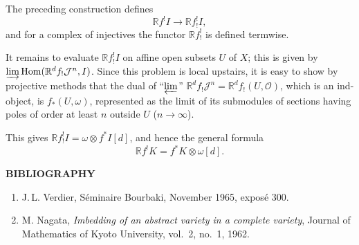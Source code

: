 \documentclass[11pt]{amsart}
\DeclareMathOperator{\Hom}{Hom}
\newcommand{\cJ}{\mathcal{J}}
\newcommand{\cO}{\mathcal{O}}
\newcommand{\bR}{\mathbb{R}}
\theoremstyle{plain}
\theoremstyle{definition}
\begin{document}
The preceding construction defines
\[
\bR f^{!}I\to \bR f^{!}_{!}I,
\]
and for a complex of injectives the functor $\bR f^{!}_{!}$ is defined termwise.

It remains to evaluate $\bR f^{!}_{!}I$ on affine open subsets $U$ of $X$; this is given by $\varinjlim \Hom(\bR^d f_!\cJ^n,I)$. Since this problem is local upstairs, it is easy to show by projective methods that the dual of ``$\varprojlim$'' $\bR^d f_!\cJ^n=\bR^d f_!(U,\cO)$, which is an ind-object, is $f_*(U,\omega)$, represented as the limit of its submodules of sections having poles of order at least $n$ outside $U$ ($n\to\infty$).

This gives $\bR f^{!}_{!}I=\omega\otimes f^*I[d]$, and hence the general formula
\[
\bR f^{!}K=f^*K\otimes \omega[d].
\]

\bigskip
\begin{center}
\textbf{BIBLIOGRAPHY}
\end{center}

\begin{enumerate}
\item[{[1]}] J.\,L. Verdier, S\'eminaire Bourbaki, November 1965, expos\'e 300.
\item[{[2]}] M. Nagata, \emph{Imbedding of an abstract variety in a complete variety}, Journal of Mathematics of Kyoto University, vol.~2, no.~1, 1962.
\end{enumerate}
\end{document}

